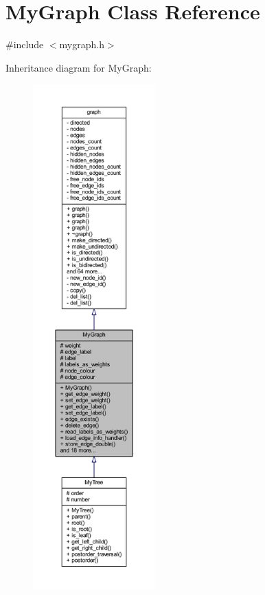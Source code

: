 \hypertarget{class_my_graph}{}\section{My\+Graph Class Reference}
\label{class_my_graph}


{\ttfamily \#include $<$mygraph.\+h$>$}



Inheritance diagram for My\+Graph\+:\nopagebreak
\begin{figure}[H]
\begin{center}
\leavevmode
\includegraphics[height=550pt]{class_my_graph__inherit__graph}
\end{center}
\end{figure}


